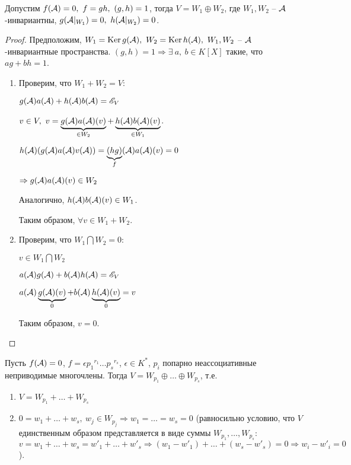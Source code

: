 \documentclass[main]{subfiles}
\begin{document}
\begin{proposition}
    Допустим $f(\mathcal{A}) = 0, \ f = gh, \ (g, h) = 1$, тогда $V = W_1 \oplus W_2$, где
    $W_1, W_2$ -- $\mathcal{A}$-инвариантны,  $g(\mathcal{A}|_{W_1}) = 0, \  h(\mathcal{A} |_{W_2}) = 0$.
\end{proposition}

\begin{proof}
    Предположим, $W_1 = \operatorname{Ker} g(\mathcal{A}), \ W_2 = \operatorname{Ker} h(\mathcal{A}), \
        W_1, W_2$ -- $\mathcal{A}$-инвариантные пространства.
    $(g, h) = 1 \Rightarrow \exists \ a, \ b \in K[X]$ такие, что $ag+bh = 1$.

    \begin{enumerate}
        \item Проверим, что $W_1 + W_2 = V$:
              \begin{center}
                  $g(\mathcal{A})a(\mathcal{A}) + h(\mathcal{A})b(\mathcal{A}) = \mathscr{E}_V$

                  $v \in V, \ v = \underbrace{g(\mathcal{A})a(\mathcal{A})(v)}_{\in W_2} + \underbrace{h(\mathcal{A})b(\mathcal{A})(v)}_{\in W_1}$.

                  $h(\mathcal{A})(g(\mathcal{A})a(\mathcal{A})v(\mathcal{A})) = \underbrace{(hg)}_{f}(\mathcal{A})a(\mathcal{A})(v) = 0 $

                  $\Rightarrow g(\mathcal{A})a(\mathcal{A})(v) \in W_2$
              \end{center}

              Аналогично, $h(\mathcal{A})b(\mathcal{A})(v) \in W_1$.

              Таким образом, $\forall v \in W_1 + W_2$.
        \item Проверим, что $W_1 \bigcap W_2 = 0$:
              \begin{center}
                  $v \in W_1 \bigcap W_2$

                  $a(\mathcal{A})g(\mathcal{A}) + b(\mathcal{A})h(\mathcal{A}) = \mathscr{E}_V$

                  $a(\mathcal{A})\underbrace{g(\mathcal{A})(v)}_{0} + b(\mathcal{A})\underbrace{h(\mathcal{A})(v)}_{0} = v$
              \end{center}
              Таким образом, $v = 0$.
    \end{enumerate}
\end{proof}


\begin{proposition}
    Пусть $f(\mathcal{A}) = 0$, $f = \epsilon {p_1}^{r_1} \ldots {p_s}^{r_s}$, $\epsilon \in K^*$,
    $p_i$ попарно неассоциативные неприводимые многочлены. Тогда $V = W_{p_1} \oplus \ldots \oplus W_{p_s}$, т.е.
    \begin{enumerate}
        \item $V = W_{p_1} + \ldots + W_{p_s}$
        \item $ 0 = w_1 + \ldots + w_s, \ w_j \in W_{p_j} \Rightarrow w_1 = \ldots = w_s = 0$ (равносильно условию, что $V$ единственным образом представляется в виде суммы $W_{p_1}, \ldots, W_{p_s}$: $v = w_1 + \ldots + w_s = w'_1 + \ldots + w'_s \Rightarrow (w_1 - w'_1) + \ldots + (w_s - w'_s) = 0 \Rightarrow w_i - w'_i = 0$).
    \end{enumerate}
\end{proposition}
\end{document}
